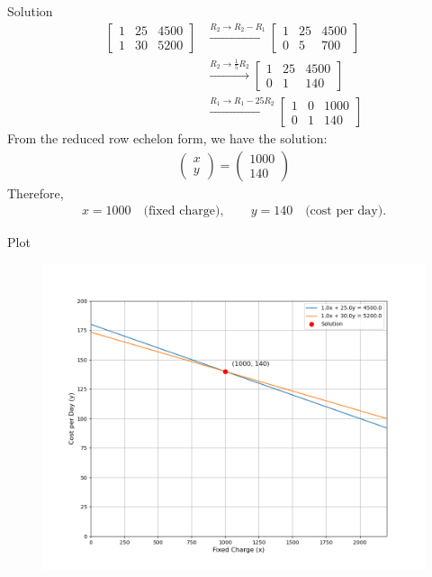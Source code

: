 \documentclass{beamer}
\newcommand{\myvec}[1]{\ensuremath{\begin{pmatrix}#1\end{pmatrix}}}
\begin{document}
\begin{frame}{Solution}
\begin{align}
	\left[\begin{array}{cc|c}
		1 & 25 & 4500 \\
		1 & 30 & 5200
	\end{array}\right]
	&\xrightarrow{R_2 \rightarrow R_2 - R_1}
	\left[\begin{array}{cc|c}
		1 & 25 & 4500 \\
		0 & 5 & 700
	\end{array}\right] \\
	&\xrightarrow{R_2 \rightarrow \tfrac{1}{5}R_2}
	\left[\begin{array}{cc|c}
		1 & 25 & 4500 \\
		0 & 1 & 140
	\end{array}\right] \\
	&\xrightarrow{R_1 \rightarrow R_1 - 25R_2}
	\left[\begin{array}{cc|c}
		1 & 0 & 1000 \\
		0 & 1 & 140
	\end{array}\right]
\end{align}
From the reduced row echelon form, we have the solution:
\begin{align}
	\myvec{x \\ y} = \myvec{1000 \\ 140}
\end{align}
Therefore,
\begin{align}
	x = 1000 \quad \text{(fixed charge)}, \qquad y = 140 \quad \text{(cost per day)}.
\end{align}
\end{frame}
\begin{frame}{Plot}
\begin{figure}[H]
	\centering
	\includegraphics[width=0.9\linewidth]{figs/hostel_charges_plot}
\end{figure}

\end{frame}
 
\end{document}
